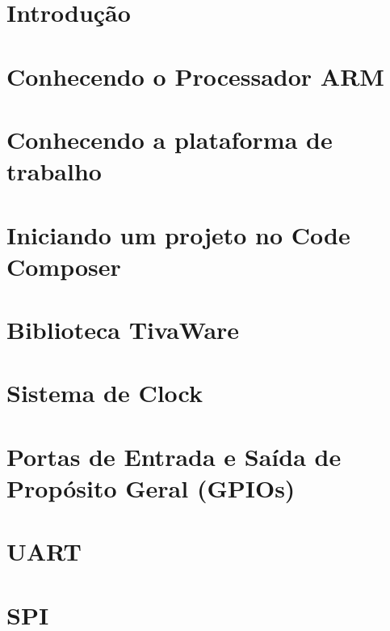 \documentclass[a4paper,10pt,oneside]{book}
\begin{document}
\maketitle

\listoffigures
\listoftables

\dominitoc
\nomtcrule
\tableofcontents

\chapter{Introdução}


\chapter{Conhecendo o Processador ARM}


\chapter{Conhecendo a plataforma de trabalho}


\chapter{Iniciando um projeto no Code Composer}


\chapter{Biblioteca TivaWare}


\chapter{Sistema de Clock}


\chapter{Portas de Entrada e Saída de Propósito Geral (GPIOs)}


\chapter{UART}


\chapter{SPI}

\end{document}
